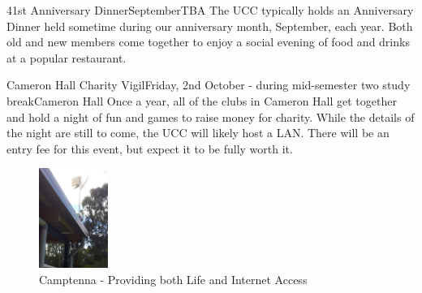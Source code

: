 \begin{event}{41st Anniversary Dinner}{September}{TBA}
The UCC typically holds an Anniversary Dinner held sometime during our anniversary month, September, each year. Both old and new members come together to enjoy a social evening of food and drinks at a popular restaurant.
\end{event}

\begin{event}{Cameron Hall Charity Vigil}{Friday, 2nd October - during mid-semester two study break}{Cameron Hall}
Once a year, all of the clubs in Cameron Hall get together and hold a night of fun and games to raise money for charity. While the details of the night are still to come, the UCC will likely host a LAN. There will be an entry fee for this event, but expect it to be fully worth it.
\end{event}


\begin{figure}[H]
	\centering
	\includegraphics[width=0.2\textwidth]{figures/Camptenna}
	\caption{Camptenna - Providing both Life and Internet Access}
	\label{Camptenna}
\end{figure}
\fi

\newpage

\noindent \color{black}{\bf Incoming message from James Cox and Lionel Price:}

